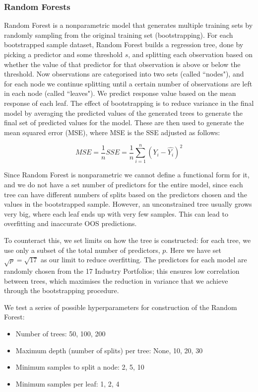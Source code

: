 \documentclass[AER]{AEA}
\begin{document}
\begin{spacing}{2}
\subsubsection{Random Forests}

Random Forest is a nonparametric model that generates multiple training sets by randomly sampling from the original training set (bootstrapping). For each bootstrapped sample dataset, Random Forest builds a regression tree, done by picking a predictor and some threshold $s$, and splitting each observation based on whether the value of that predictor for that observation is above or below the threshold. Now observations are categorised into two sets (called ``nodes"), and for each node we continue splitting until a certain number of observations are left in each node (called ``leaves"). We predict response value based on the mean response of each leaf. The effect of bootstrapping is to reduce variance in the final model by averaging the predicted values of the generated trees to generate the final set of predicted values for the model. These are then used to generate the mean squared error (MSE), where MSE is the SSE adjusted as follows:

\begin{equation}
    MSE=\frac{1}{n}SSE=\frac{1}{n}\sum_{i=1}^n(Y_i-\hat{Y_i})^2
\end{equation}

Since Random Forest is nonparametric we cannot define a functional form for it, and we do not have a set number of predictors for the entire model, since each tree can have different numbers of splits based on the predictors chosen and the values in the bootstrapped sample. However, an unconstrained tree usually grows very big, where each leaf ends up with very few samples. This can lead to overfitting and inaccurate OOS predictions.

To counteract this, we set limits on how the tree is constructed: for each tree, we use only a subset of the total number of predictors, $p$. Here we have set $\sqrt{p} = \sqrt{17}$ as our limit to reduce overfitting. The predictors for each model are randomly chosen from the 17 Industry Portfolios; this ensures low correlation between trees, which maximises the reduction in variance that we achieve through the bootstrapping procedure.

We test a series of possible hyperparameters for construction of the Random Forest:
\begin{itemize}
    \item Number of trees: 50, 100, 200
    \item Maximum depth (number of splits) per tree: None, 10, 20, 30
    \item Minimum samples to split a node: 2, 5, 10
    \item Minimum samples per leaf: 1, 2, 4
\end{itemize}


\end{spacing}
\end{document}
